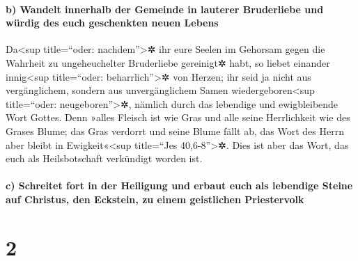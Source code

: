 \hypertarget{b-wandelt-innerhalb-der-gemeinde-in-lauterer-bruderliebe-und-wuxfcrdig-des-euch-geschenkten-neuen-lebens}{%
\paragraph{b) Wandelt innerhalb der Gemeinde in lauterer Bruderliebe und
würdig des euch geschenkten neuen
Lebens}\label{b-wandelt-innerhalb-der-gemeinde-in-lauterer-bruderliebe-und-wuxfcrdig-des-euch-geschenkten-neuen-lebens}}

 Da\textless sup title=``oder: nachdem''\textgreater✲ ihr
eure Seelen im Gehorsam gegen die Wahrheit zu ungeheuchelter Bruderliebe
gereinigt✲ habt, so liebet einander innig\textless sup title=``oder:
beharrlich''\textgreater✲ von Herzen;  ihr seid ja nicht
aus vergänglichem, sondern aus unvergänglichem Samen
wiedergeboren\textless sup title=``oder: neugeboren''\textgreater✲,
nämlich durch das lebendige und ewigbleibende Wort Gottes.
 Denn »alles Fleisch ist wie Gras und alle seine
Herrlichkeit wie des Grases Blume; das Gras verdorrt und seine Blume
fällt ab,  das Wort des Herrn aber bleibt in
Ewigkeit«\textless sup title=``Jes 40,6-8''\textgreater✲. Dies ist aber
das Wort, das euch als Heilsbotschaft verkündigt worden ist.

\hypertarget{c-schreitet-fort-in-der-heiligung-und-erbaut-euch-als-lebendige-steine-auf-christus-den-eckstein-zu-einem-geistlichen-priestervolk}{%
\paragraph{c) Schreitet fort in der Heiligung und erbaut euch als
lebendige Steine auf Christus, den Eckstein, zu einem geistlichen
Priestervolk}\label{c-schreitet-fort-in-der-heiligung-und-erbaut-euch-als-lebendige-steine-auf-christus-den-eckstein-zu-einem-geistlichen-priestervolk}}

\hypertarget{section-1}{%
\section{2}\label{section-1}}

